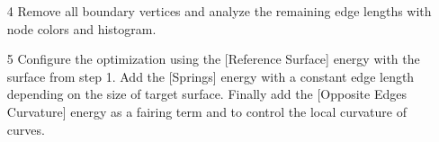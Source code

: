 \documentclass[Thesis.tex]{subfiles}
\begin{document}
\begin{itemize}
\item[4] Remove all boundary vertices and analyze the remaining edge lengths with node colors and histogram.

\begin{center}
\begin{minipage}{0.9\linewidth}
            \centering
\end{minipage}
\end{center}   

\item[5] Configure the optimization using the [Reference Surface] energy with the surface from step 1. Add the [Springs] energy with a constant edge length depending on the size of target surface. Finally add the [Opposite Edges Curvature] energy as a fairing term and to control the local curvature of curves.

\begin{center}
\begin{minipage}{0.9\linewidth}
            \centering
\end{minipage}
\end{center}   

\end{itemize}

\subfilebibliography
\end{document}
